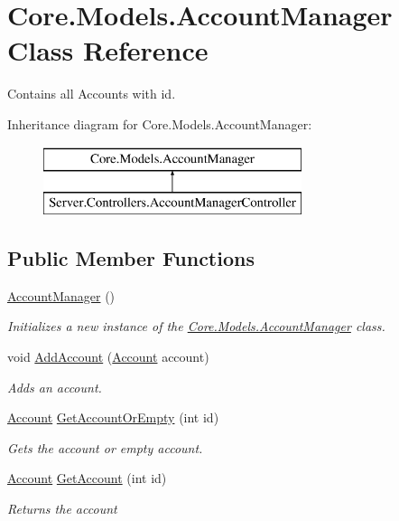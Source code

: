 \hypertarget{classCore_1_1Models_1_1AccountManager}{}\section{Core.\+Models.\+Account\+Manager Class Reference}
\label{classCore_1_1Models_1_1AccountManager}


Contains all Accounts with id.  


Inheritance diagram for Core.\+Models.\+Account\+Manager\+:\begin{figure}[H]
\begin{center}
\leavevmode
\includegraphics[height=2.000000cm]{classCore_1_1Models_1_1AccountManager}
\end{center}
\end{figure}
\subsection*{Public Member Functions}
\begin{DoxyCompactItemize}
\item 
\hyperlink{classCore_1_1Models_1_1AccountManager_a357ec5ceeaea360024b22a2db95983f9}{Account\+Manager} ()
\begin{DoxyCompactList}\small\item\em Initializes a new instance of the \hyperlink{classCore_1_1Models_1_1AccountManager}{Core.\+Models.\+Account\+Manager} class. \end{DoxyCompactList}\item 
void \hyperlink{classCore_1_1Models_1_1AccountManager_a191e85e6daf1d61bf6b0f0318c304875}{Add\+Account} (\hyperlink{classCore_1_1Models_1_1Account}{Account} account)
\begin{DoxyCompactList}\small\item\em Adds an account. \end{DoxyCompactList}\item 
\hyperlink{classCore_1_1Models_1_1Account}{Account} \hyperlink{classCore_1_1Models_1_1AccountManager_aa34df711aff2cc6588f78e6abc6e9ad2}{Get\+Account\+Or\+Empty} (int id)
\begin{DoxyCompactList}\small\item\em Gets the account or empty account. \end{DoxyCompactList}\item 
\hyperlink{classCore_1_1Models_1_1Account}{Account} \hyperlink{classCore_1_1Models_1_1AccountManager_a0a85126c3cd1a3ceeb6ceb08f0d817cb}{Get\+Account} (int id)
\begin{DoxyCompactList}\small\item\em Returns the account \end{DoxyCompactList}\end{DoxyCompactItemize}
